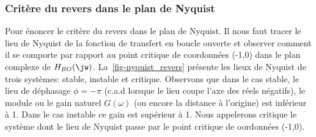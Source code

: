 \subsubsection{Critère du revers dans le plan de Nyquist}

Pour énoncer le critère du revers dans le plan de Nyquist. Il nous faut tracer
le lieu de Nyquist de la fonction de transfert en boucle ouverte et observer comment il 
se comporte par rapport au point critique de coordonnées (-1,0) dans le plan complexe de $H_{BO}(\jw)$.
La~\cref{fig-nyquist_revers} présente les lieux de Nyquist de trois systèmes: stable, instable et critique.
Observons que dans le cas stable, le lieu de déphasage $\phi=-\pi$ (c.a.d lorsque le lieu coupe l'axe des réels négatifs), 
le module ou le gain naturel $G(\omega)$ (ou encore la distance à l'origine) est inférieur à 1. 
Dans le cas instable ce gain est supérieur à 1. Nous appelerons critique le système dont le lieu de Nyquist passe par le
point critique de oordonnées (-1,0).

